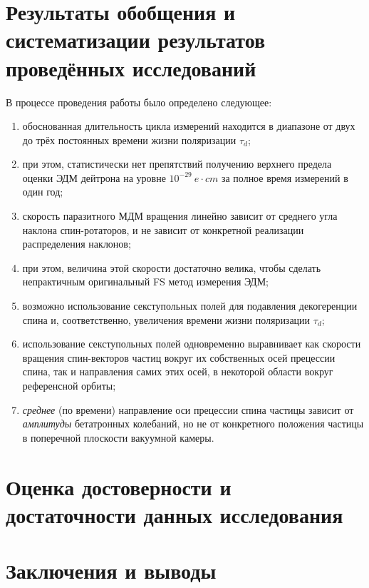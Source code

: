 \documentclass{report}
\newcommand{\LTd}{\tau_d}
\newcommand{\home}{/home/alexa}
\begin{document}
\chapter{Результаты обобщения и систематизации результатов проведённых исследований}

В процессе проведения работы было определено следующее:
\begin{enumerate}
	\item обоснованная длительность цикла измерений находится в диапазоне от двух до трёх постоянных времени жизни поляризации $\LTd$;
	\item при этом, статистически нет препятствий получению верхнего предела оценки ЭДМ дейтрона на уровне $10^{-29}~e\cdot cm$ за полное время измерений в один год;
	\item скорость паразитного МДМ вращения линейно зависит от среднего угла наклона спин-ротаторов, и не зависит от конкретной реализации распределения наклонов;
	\item при этом, величина этой скорости достаточно велика, чтобы сделать непрактичным оригинальный FS метод измерения ЭДМ;
	\item возможно использование секступольных полей для подавления декогеренции спина и, соответственно, увеличения времени жизни поляризации $\LTd$;
	\item использование секступольных полей одновременно выравнивает как скорости вращения спин-векторов частиц вокруг их собственных осей прецессии спина, так и направления самих этих осей, в некоторой области вокруг референсной орбиты;
	\item \emph{среднее} (по времени) направление оси прецессии спина частицы зависит от \emph{амплитуды} бетатронных колебаний, но не от конкретного положения частицы в поперечной плоскости вакуумной камеры.
\end{enumerate}

\chapter{Оценка достоверности и достаточности данных исследования}

\chapter{Заключения и выводы}



\end{document}
